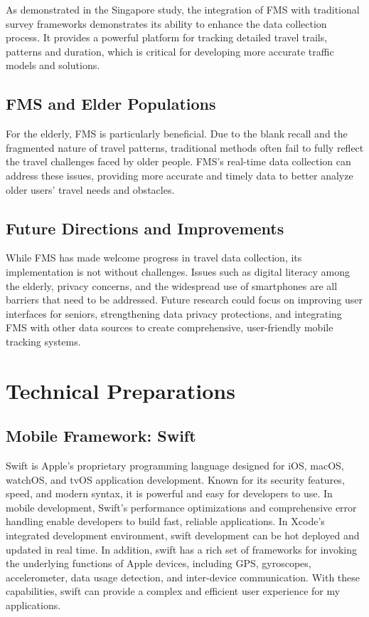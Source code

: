 \documentclass[12pt,two side]{report}
\begin{document}
As demonstrated in the Singapore study, the integration of FMS with traditional survey frameworks demonstrates its ability to enhance the data collection process. It provides a powerful platform for tracking detailed travel trails, patterns and duration, which is critical for developing more accurate traffic models and solutions.
\section{FMS and Elder Populations}
For the elderly, FMS is particularly beneficial. Due to the blank recall and the fragmented nature of travel patterns, traditional methods often fail to fully reflect the travel challenges faced by older people. FMS's real-time data collection can address these issues, providing more accurate and timely data to better analyze older users' travel needs and obstacles.
\section{Future Directions and Improvements}
While FMS has made welcome progress in travel data collection, its implementation is not without challenges. Issues such as digital literacy among the elderly, privacy concerns, and the widespread use of smartphones are all barriers that need to be addressed. Future research could focus on improving user interfaces for seniors, strengthening data privacy protections, and integrating FMS with other data sources to create comprehensive, user-friendly mobile tracking systems.

\chapter{Technical Preparations}
\section{Mobile Framework: Swift\cite{swift}}

Swift is Apple's proprietary programming language designed for iOS, macOS, watchOS, and tvOS application development. Known for its security features, speed, and modern syntax, it is powerful and easy for developers to use. In mobile development, Swift's performance optimizations and comprehensive error handling enable developers to build fast, reliable applications. In Xcode's integrated development environment, swift development can be hot deployed and updated in real time. In addition, swift has a rich set of frameworks for invoking the underlying functions of Apple devices, including GPS, gyroscopes, accelerometer, data usage detection, and inter-device communication. With these capabilities, swift can provide a complex and efficient user experience for my applications.
\end{document}
